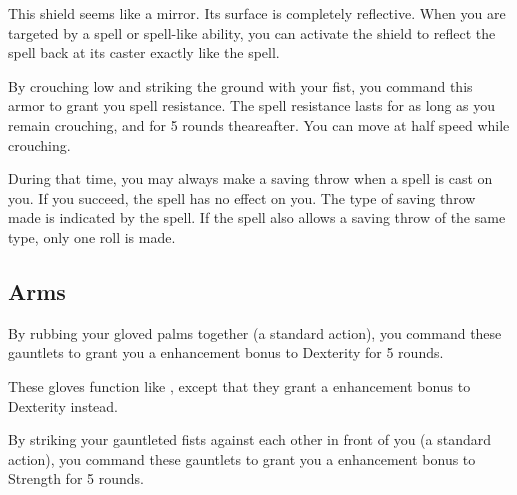 
 This shield seems like a mirror. Its surface is completely reflective. When you are targeted by a spell or spell-like ability, you can activate the shield to reflect the spell back at its caster exactly like the  spell.


 By crouching low and striking the ground with your fist, you command this armor to grant you spell resistance. The spell resistance lasts for as long as you remain crouching, and for 5 rounds theareafter. You can move at half speed while crouching.

During that time, you may always make a saving throw when a spell is cast on you. If you succeed, the spell has no effect on you. The type of saving throw made is indicated by the spell. If the spell also allows a saving throw of the same type, only one roll is made.


\subsection{Arms}

 By rubbing your gloved palms together (a standard action), you command these gauntlets to grant you a  enhancement bonus to Dexterity for 5 rounds.


 These gloves function like , except that they grant a  enhancement bonus to Dexterity instead.


 By striking your gauntleted fists against each other in front of you (a standard action), you command these gauntlets to grant you a  enhancement bonus to Strength for 5 rounds.

